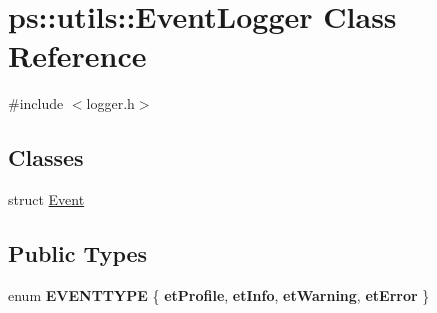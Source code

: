 \hypertarget{classps_1_1utils_1_1EventLogger}{}\section{ps\+:\+:utils\+:\+:Event\+Logger Class Reference}
\label{classps_1_1utils_1_1EventLogger}


{\ttfamily \#include $<$logger.\+h$>$}

\subsection*{Classes}
\begin{DoxyCompactItemize}
\item 
struct \hyperlink{structps_1_1utils_1_1EventLogger_1_1Event}{Event}
\end{DoxyCompactItemize}
\subsection*{Public Types}
\begin{DoxyCompactItemize}
\item 
\hypertarget{classps_1_1utils_1_1EventLogger_a2ec7ed52f7fe7780454cfa214ecdc575}{}enum {\bfseries E\+V\+E\+N\+T\+T\+Y\+P\+E} \{ {\bfseries et\+Profile}, 
{\bfseries et\+Info}, 
{\bfseries et\+Warning}, 
{\bfseries et\+Error}
 \}\label{classps_1_1utils_1_1EventLogger_a2ec7ed52f7fe7780454cfa214ecdc575}

\end{DoxyCompactItemize}

